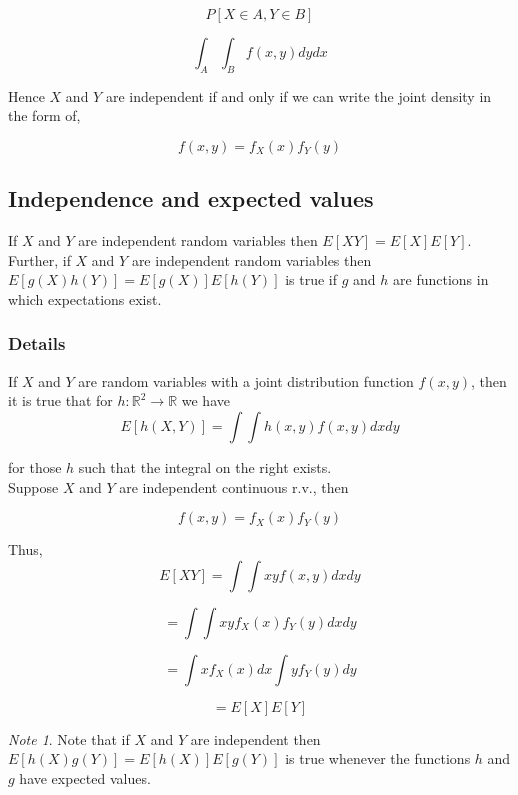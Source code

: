 \documentclass[12pt,a4paper]{article}
\theoremstyle{regla}
\theoremstyle{remark}
\newtheorem{notes}{Note}[section]
\theoremstyle{definition}
\theoremstyle{nonumberbreak}
\begin{document}
$$ P [X \in A, Y \in B] $$

$$ \int_{A}\int_{B} f (x,y) dydx $$

Hence $X$ and $Y$ are independent if and only if we can write the joint density in the form of,

$$ f(x ,y) = f_X (x)f_Y (y) $$


\subsection{Independence and expected values}
\begin{fbox}
\begin{minipage}{0.97\textwidth}
If $X$ and $Y$ are independent random variables then $E[XY]=E[X]E[Y]$.\\

Further, if $X$ and $Y$ are independent random variables then $E[g(X)h(Y)]=E[g(X)]E[h(Y)]$ is true if $g$ and $h$ are functions in which expectations exist.
\end{minipage}
\end{fbox}
\subsubsection{Details}
If $X$ and $Y$ are random variables with a joint distribution function $f(x,y)$, then it is true that for $h:\mathbb{R}^2\to\mathbb{R}$ we have 
$$E[h(X,Y)]=\int\int h(x,y)f(x,y)dxdy$$

for those $h$ such that the integral on the right exists. \\

Suppose $X$ and $Y$ are independent continuous r.v., then

$$ f(x,y) = f_X (x) f_Y (y)$$

Thus, $$E[XY] = \int\int xy f (x,y) dxdy $$

$$= \int\int xy f_X (x) f_Y (y) dxdy $$

$$ = \int xf_X (x) dx \int yf_Y (y) dy $$

$$ = E [X] E [Y] $$

\begin{notes}
Note that if $X$ and $Y$ are independent then $ E [h (X)g (Y)] = E [h(X)] E[g(Y)]$ is true whenever the functions $h$ and $g$ have expected values.
\end{notes}
\end{document}
